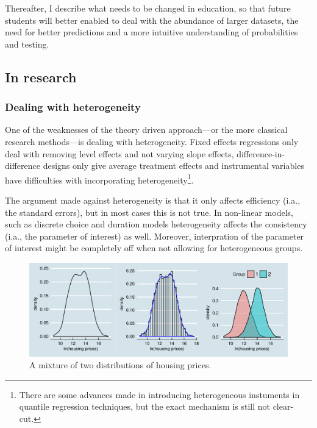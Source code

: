 \documentclass[fleqn,10pt]{SelfArx} %
\begin{document}
Thereafter, I describe what needs to be changed in education, so that future
students will better enabled to deal with the abundance of larger datasets, the
need for better predictions and a more intuitive understanding of probabilities
and testing.

\subsection{In research}

\subsubsection{Dealing with heterogeneity}

One of the weaknesses of the theory driven approach---or the more classical
research methods---is dealing with heterogeneity. Fixed effects regressions
only deal with removing level effects and not varying slope effects,
difference-in-difference designs only give average treatment effects and
instrumental variables have difficulties with incorporating
heterogeneity\footnote{There are some advances made in introducing
  heterogeneous instuments in quantile regression techniques, but the exact
  mechanism is still not clear-cut.}.

The argument made against heterogeneity is that it only affects efficiency
(i.a., the standard errors), but in most cases this is not true. In non-linear
models, such as discrete choice and duration models heterogeneity affects the
consistency (i.a., the parameter of interest) as well. Moreover, interpration of
the parameter of interest might be completely off when not allowing for
heterogeneous groups. 

\begin{figure}[t!]\centering 
		\includegraphics[width=\textwidth]{./figures/mixture}
	\caption{A mixture of two distributions of housing prices.}
	\label{fig:mixturetwocultures}
\end{figure}
\end{document}
